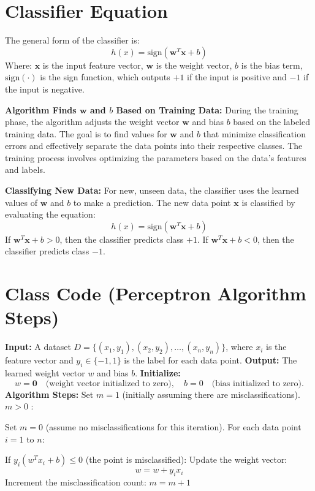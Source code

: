 \section{Classifier Equation}


The general form of the classifier is:
\[
h(x) = \text{sign}(\mathbf{w}^T \mathbf{x} + b)
\]
Where:
\( \mathbf{x} \) is the input feature vector,
\( \mathbf{w} \) is the weight vector,
\( b \) is the bias term,
\( \text{sign}(\cdot) \) is the sign function, which outputs \( +1 \) if the input is positive and \( -1 \) if the input is negative.

\begin{outline}
    \1 \textbf{Algorithm Finds \( \mathbf{w} \) and \( b \) Based on Training Data:} 
    During the training phase, the algorithm adjusts the weight vector \( \mathbf{w} \) and bias \( b \) based on the labeled training data. 
    The goal is to find values for \( \mathbf{w} \) and \( b \) that minimize classification errors and effectively separate the data points into their respective classes. 
    The training process involves optimizing the parameters based on the data's features and labels.

    \1 \textbf{Classifying New Data:} 
    For new, unseen data, the classifier uses the learned values of \( \mathbf{w} \) and \( b \) to make a prediction. 
    The new data point \( \mathbf{x} \) is classified by evaluating the equation:
    \[
    h(x) = \text{sign}(\mathbf{w}^T \mathbf{x} + b)
    \]
        \2 If \( \mathbf{w}^T \mathbf{x} + b > 0 \), then the classifier predicts class \( +1 \).
        \2 If \( \mathbf{w}^T \mathbf{x} + b < 0 \), then the classifier predicts class \( -1 \).
\end{outline}

\section{Class Code (Perceptron Algorithm Steps)}

\begin{outline}
    \1 \textbf{Input:} A dataset \( D = \{(x_1, y_1), (x_2, y_2), \dots, (x_n, y_n)\} \), where \( x_i \) is the feature vector and \( y_i \in \{-1, 1\} \) is the label for each data point.
    \1 \textbf{Output:} The learned weight vector \( w \) and bias \( b \).
    \1 \textbf{Initialize:} 
    \[
    w = \mathbf{0} \quad \text{(weight vector initialized to zero)}, \quad b = 0 \quad \text{(bias initialized to zero)}.
    \]
    \1 \textbf{Algorithm Steps:}
        \2[1.] Set \( m = 1 \) (initially assuming there are misclassifications).
        \2[2.]  \( m > 0 \) :
        
            \3[(a). ] Set \( m = 0 \) (assume no misclassifications for this iteration).
            \3[(b). ] For each data point \( i = 1 \) to \( n \):
            
                \4 If \( y_i (w^T x_i + b) \leq 0 \) (the point is misclassified):
                \4 Update the weight vector: 
                \[
                w = w + y_i x_i
                \]
                \4 Increment the misclassification count: \( m = m + 1 \)
\end{outline}
